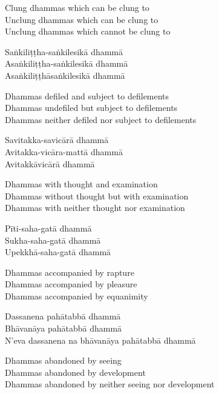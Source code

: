 \begin{english}
  Clung dhammas which can be clung to\\
  Unclung dhammas which can be clung to\\
  Unclung dhammas which cannot be clung to
\end{english}

Saṅkiliṭṭha-saṅkilesikā dhammā\\
Asaṅkiliṭṭha-saṅkilesikā dhammā\\
Asaṅkiliṭṭhāsaṅkilesikā dhammā

\begin{english}
  Dhammas defiled and subject to defilements\\
  Dhammas undefiled but subject to defilements\\
  Dhammas neither defiled nor subject to defilements
\end{english}

Savitakka-savicārā dhammā\\
Avitakka-vicāra-mattā dhammā\\
Avitakkāvicārā dhammā

\begin{english}
  Dhammas with thought and examination\\
  Dhammas without thought but with examination\\
  Dhammas with neither thought nor examination
\end{english}

Pīti-saha-gatā dhammā\\
Sukha-saha-gatā dhammā\\
Upekkhā-saha-gatā dhammā

\begin{english}
  Dhammas accompanied by rapture\\
  Dhammas accompanied by pleasure\\
  Dhammas accompanied by equanimity
\end{english}

Dassanena pahātabbā dhammā\\
Bhāvanāya pahātabbā dhammā\\
N'eva dassanena na bhāvanāya pahātabbā dhammā

\begin{english}
  Dhammas abandoned by seeing\\
  Dhammas abandoned by development\\
  Dhammas abandoned by neither seeing nor development
\end{english}


